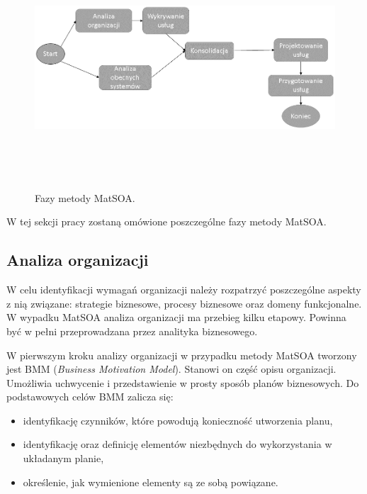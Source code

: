 \begin{figure}[h!tbp]
\begin{centering}
\includegraphics[width=14cm, height=9cm]{img/MetMatSOA.png}
\caption[Fazy metody MatSOA.]{Fazy metody MatSOA.}\label{soam_lifecycle}
\end{centering}
\end{figure}


W tej sekcji pracy zostaną omówione poszczególne fazy metody MatSOA.

\subsection*{Analiza organizacji}
W celu identyfikacji wymagań organizacji należy rozpatrzyć poszczególne aspekty z nią związane: strategie biznesowe, procesy biznesowe oraz domeny funkcjonalne. W wypadku MatSOA analiza organizacji ma przebieg kilku etapowy. Powinna być w pełni przeprowadzana przez analityka biznesowego.

W pierwszym kroku analizy organizacji w przypadku metody MatSOA tworzony jest BMM  (\emph{Business Motivation Model}). Stanowi on część opisu organizacji. Umożliwia uchwycenie i przedstawienie w prosty sposób planów biznesowych. Do podstawowych celów BMM zalicza się:
\begin{itemize}
\item{identyfikację czynników, które powodują konieczność utworzenia planu,}
\item{identyfikację oraz definicję elementów niezbędnych do wykorzystania w układanym planie,}
\item{określenie, jak wymienione elementy są ze sobą powiązane.}
\end{itemize}

